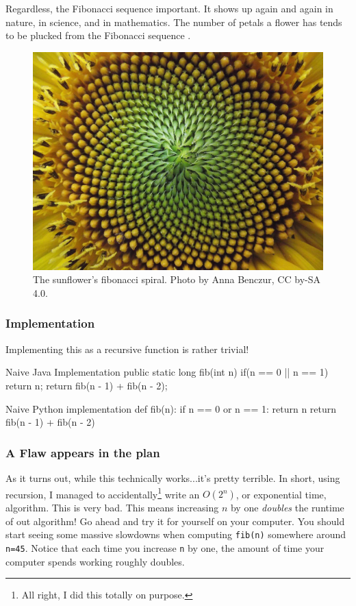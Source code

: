 Regardless, the Fibonacci sequence important.  It shows up again and again in nature, in science, and in mathematics.  The number of petals a flower has tends to be plucked from the Fibonacci sequence \cite{turner2020flowers}.


\begin{figure}
	\centering
	\includegraphics[width=0.7\linewidth]{pics/sunflower}
	\caption{The sunflower's fibonacci spiral. Photo by Anna Benczur, CC by-SA 4.0.}
	\label{fig:sunflower}
\end{figure}




\subsubsection{Implementation}
Implementing this as a recursive function is rather trivial!

\begin{javacode}{Naive Java Implementation}
public static long fib(int n){
	if(n == 0 || n == 1) {
		return n;
	}
	return fib(n - 1) + fib(n - 2);
}
\end{javacode}

\begin{pycode}{Naive Python implementation}
def fib(n):
	if n == 0 or n == 1:
		return n
	return fib(n - 1) + fib(n - 2)
\end{pycode}

\subsubsection{A Flaw appears in the plan}
As it turns out, while this technically works...it's pretty terrible.  In short, using recursion, I managed to accidentally\footnote{All right, I did this totally on purpose.} write an $ O(2^n) $, or exponential time, algorithm. This is very bad.  This means increasing $ n $ by one \emph{doubles} the runtime of out algorithm! Go ahead and try it for yourself on your computer.  You should start seeing some massive slowdowns when computing \texttt{fib(n)} somewhere around \texttt{n=45}.  Notice that each time you increase \texttt{n} by one, the amount of time your computer spends working roughly doubles.

